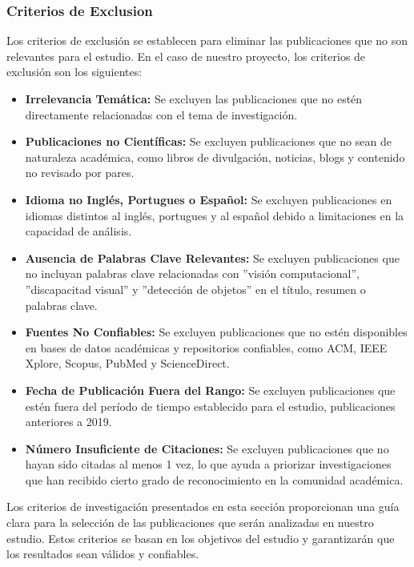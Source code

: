 \documentclass[letterpaper]{article}
\begin{document}
\subsubsection{Criterios de Exclusion}

Los criterios de exclusión se establecen para eliminar las publicaciones que no son relevantes para el estudio. En el caso de nuestro proyecto, los criterios de exclusión son los siguientes:

\begin{itemize}
    \item \textbf{Irrelevancia Temática: }Se excluyen las publicaciones que no estén directamente relacionadas con el tema de investigación.
    \item \textbf{Publicaciones no Científicas: }Se excluyen publicaciones que no sean de naturaleza académica, como libros de divulgación, noticias, blogs y contenido no revisado por pares.
    \item \textbf{Idioma no Inglés, Portugues o Español: }Se excluyen publicaciones en idiomas distintos al inglés, portugues y al español debido a limitaciones en la capacidad de análisis.
    \item \textbf{Ausencia de Palabras Clave Relevantes: }Se excluyen publicaciones que no incluyan palabras clave relacionadas con ''visión computacional'', ''discapacitad visual'' y ''detección de objetos'' en el título, resumen o palabras clave.
    \item \textbf{Fuentes No Confiables: }Se excluyen publicaciones que no estén disponibles en bases de datos académicas y repositorios confiables, como ACM, IEEE Xplore, Scopus, PubMed y ScienceDirect.
    \item \textbf{Fecha de Publicación Fuera del Rango: }Se excluyen publicaciones que estén fuera del período de tiempo establecido para el estudio, publicaciones anteriores a 2019.
    \item \textbf{Número Insuficiente de Citaciones: }Se excluyen publicaciones que no hayan sido citadas al menos 1 vez, lo que ayuda a priorizar investigaciones que han recibido cierto grado de reconocimiento en la comunidad académica.
\end{itemize}

Los criterios de investigación presentados en esta sección proporcionan una guía clara para la selección de las publicaciones que serán analizadas en nuestro estudio. Estos criterios se basan en los objetivos del estudio y garantizarán que los resultados sean válidos y confiables. 
\end{document}
